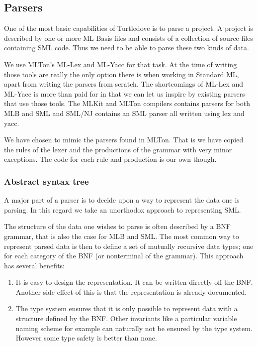 \subsection{Parsers}
\label{sec:design-parsers}

One of the most basic capabilities of Turtledove is to parse a project. A
project is described by one or more ML Basis files and consists of a collection
of source files containing SML code. Thus we need to be able to parse these two
kinds of data.

We use MLTon's ML-Lex and ML-Yacc for that task. At the time of writing those
tools are really the only option there is when working in Standard ML, apart
from writing the parsers from scratch. The shortcomings of ML-Lex and ML-Yacc is
more than paid for in that we can let us inspire by existing parsers that use
those tools. The MLKit and MLTon compilers contains parsers for both MLB and SML
and SML/NJ contains an SML parser all written using lex and yacc.

We have chosen to mimic the parsers found in MLTon. That is we have copied the
rules of the lexer and the productions of the grammar with very minor
exceptions. The code for each rule and production is our own though.

\subsubsection{Abstract syntax tree}

A major part of a parser is to decide upon a way to represent the data one is
parsing. In this regard we take an unorthodox approach to representing SML.

The structure of the data one wishes to parse is often described by a BNF
grammar, that is also the case for MLB and SML. The most common way to represent
parsed data is then to define a set of mutually recursive data types; one for
each category of the BNF (or nonterminal of the grammar). This approach has
several benefits:

\begin{enumerate}
\item It is easy to design the representation. It can be written directly off the
      BNF. Another side effect of this is that the representation is already
      documented.
\item The type system ensures that it is only possible to represent data with a
      structure defined by the BNF. Other invariants like a particular variable
      naming scheme for example can naturally not be ensured by the type
      system. However some type safety is better than none.
\end{enumerate}

